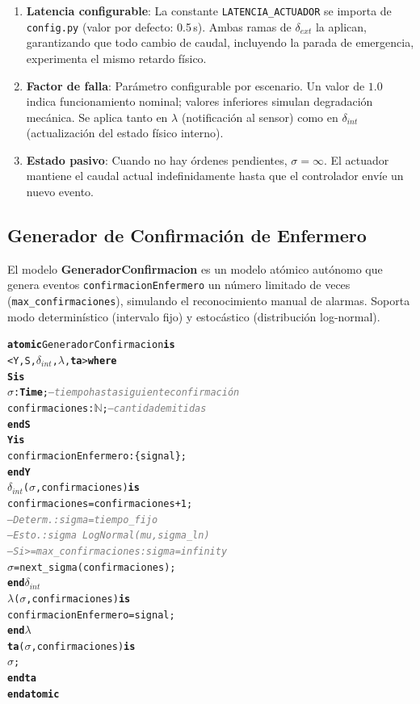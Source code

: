 \documentclass[12pt,a4paper]{article}
\newcommand{\cmlN}{$\mathbb{N}$}
\newcommand{\kw}[1]{\textbf{#1}}
\newcommand{\cmlTime}{\textbf{Time}}
\newcommand{\cmlsigma}{$\sigma$}
\newcommand{\dint}{$\delta_{\mathit{int}}$}
\newcommand{\clambda}{$\lambda$}
\newcommand{\cmlta}{\textbf{ta}}
\newcommand{\cmlcomment}[1]{\textit{\textcolor{gray}{#1}}}
\newenvironment{cmldevs}{%
  \begin{alltt}\small%
}{%
  \end{alltt}%
}
\begin{document}
\begin{enumerate}
    \item \textbf{Latencia configurable}: La constante
    \texttt{LATENCIA\_ACTUADOR} se importa de \texttt{config.py} (valor
    por defecto: 0.5\,s).  Ambas ramas de $\delta_{\mathit{ext}}$ la
    aplican, garantizando que todo cambio de caudal, incluyendo la
    parada de emergencia, experimenta el mismo retardo físico.

    \item \textbf{Factor de falla}: Parámetro configurable por
    escenario.  Un valor de $1.0$ indica funcionamiento nominal;
    valores inferiores simulan degradación mecánica.  Se aplica tanto
    en $\lambda$ (notificación al sensor) como en $\delta_{\mathit{int}}$
    (actualización del estado físico interno).

    \item \textbf{Estado pasivo}: Cuando no hay órdenes pendientes,
    $\sigma = \infty$.  El actuador mantiene el caudal actual
    indefinidamente hasta que el controlador envíe un nuevo evento.
\end{enumerate}

\subsection{Generador de Confirmación de Enfermero}

El modelo \textbf{GeneradorConfirmacion} es un modelo atómico autónomo
que genera eventos \texttt{confirmacionEnfermero} un número limitado
de veces (\texttt{max\_confirmaciones}), simulando el reconocimiento
manual de alarmas.  Soporta modo determinístico (intervalo fijo) y
estocástico (distribución log-normal).

\begin{center}
\begin{cmldevs}
\kw{atomic} GeneradorConfirmacion \kw{is}
    <Y, S, \dint{}, \clambda{}, \cmlta{}> \kw{where}
\kw{S is}
    \cmlsigma{}                 : \cmlTime{}; \cmlcomment{-- tiempo hasta siguiente confirmación}
    confirmaciones : \cmlN{};    \cmlcomment{-- cantidad emitidas}
\kw{end S}
\kw{Y is}
    confirmacionEnfermero : \{signal\};
\kw{end Y}
\dint{}(\cmlsigma{}, confirmaciones) \kw{is}
    confirmaciones = confirmaciones + 1;
    \cmlcomment{-- Determ.: sigma = tiempo\_fijo}
    \cmlcomment{-- Esto.:  sigma ~ LogNormal(mu, sigma\_ln)}
    \cmlcomment{-- Si >= max\_confirmaciones: sigma = infinity}
    \cmlsigma{} = next\_sigma(confirmaciones);
\kw{end} \dint{}
\clambda{}(\cmlsigma{}, confirmaciones) \kw{is}
    confirmacionEnfermero = signal;
\kw{end} \clambda{}
\cmlta{}(\cmlsigma{}, confirmaciones) \kw{is}
    \cmlsigma{};
\kw{end} \cmlta{}
\kw{end atomic}
\end{cmldevs}
\label{fig:generador-confirmacion}
\end{center}
\end{document}

